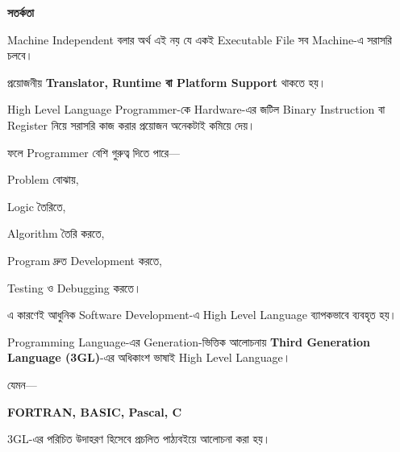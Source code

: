 \begin{rememberbox}

\textbf{\color{deepOrange}সতর্কতা}

Machine Independent বলার অর্থ এই নয় যে একই Executable File
সব Machine-এ সরাসরি চলবে।

প্রয়োজনীয় \textbf{Translator, Runtime বা Platform Support}
থাকতে হয়।

\end{rememberbox}


High Level Language Programmer-কে Hardware-এর জটিল Binary
Instruction বা Register নিয়ে সরাসরি কাজ করার প্রয়োজন অনেকটাই কমিয়ে দেয়।

ফলে Programmer বেশি গুরুত্ব দিতে পারে—

\begin{compacttwocolpoints}

\item Problem বোঝায়,

\item Logic তৈরিতে,

\item Algorithm তৈরি করতে,

\item Program দ্রুত Development করতে,

\item Testing ও Debugging করতে।

\end{compacttwocolpoints}

এ কারণেই আধুনিক Software Development-এ High Level Language
ব্যাপকভাবে ব্যবহৃত হয়।


Programming Language-এর Generation-ভিত্তিক আলোচনায়
\textbf{Third Generation Language (3GL)}-এর অধিকাংশ ভাষাই
High Level Language।

যেমন—

\begin{center}

\textbf{
FORTRAN, BASIC, Pascal, C
}

\end{center}

3GL-এর পরিচিত উদাহরণ হিসেবে প্রচলিত পাঠ্যবইয়ে আলোচনা করা হয়।


